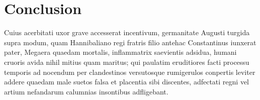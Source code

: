 \chapter{Conclusion }

Cuius acerbitati uxor grave accesserat incentivum, germanitate Augusti
turgida supra modum, quam Hannibaliano regi fratris filio antehac
Constantinus iunxerat pater, Megaera quaedam mortalis, inflammatrix
saevientis adsidua, humani cruoris avida nihil mitius quam maritus;
qui paulatim eruditiores facti processu temporis ad nocendum per
clandestinos versutosque rumigerulos conpertis leviter addere quaedam
male suetos falsa et placentia sibi discentes, adfectati regni vel
artium nefandarum calumnias insontibus adfligebant.

